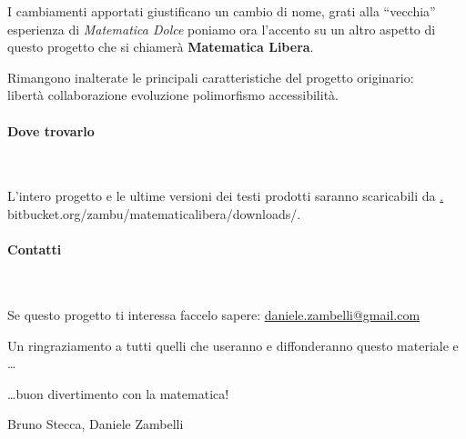 I cambiamenti apportati giustificano un cambio di nome, 
grati alla ``vecchia'' esperienza di \emph{Matematica Dolce} 
poniamo ora l'accento su un altro aspetto di questo progetto che si 
chiamerà \textbf{Matematica Libera}.

Rimangono inalterate le principali caratteristiche del progetto 
originario:\\[.5em]
{\Large \centering
libertà \quad collaborazione \quad evoluzione \quad polimorfismo \quad
accessibilità.
}

\paragraph {Dove trovarlo}~

L'intero progetto e le ultime versioni dei testi prodotti saranno 
scaricabili da 
\href{https://bitbucket.org/zambu/matematicalibera/downloads/}.
{bitbucket.org/zambu/matematicalibera/downloads/}.

\paragraph {Contatti}~

Se questo progetto ti interessa faccelo sapere: 
\href{mailto:daniele.zambelli@gmail.com}{daniele.zambelli@gmail.com}

\vspace{2em}
Un ringraziamento a tutti quelli che useranno e diffonderanno questo 
materiale e
\dots

\dots buon divertimento con la matematica!
\begin{flushright}
Bruno Stecca, Daniele Zambelli
\end{flushright}
